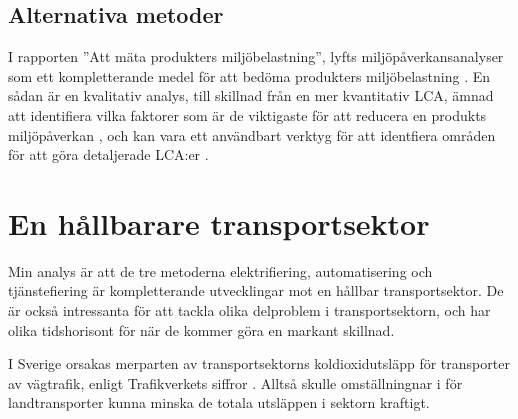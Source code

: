 \documentclass{article}
\begin{document}
\subsection{Alternativa metoder}

I rapporten ''Att mäta produkters miljöbelastning'', lyfts miljöpåverkansanalyser som ett kompletterande medel för att bedöma produkters miljöbelastning . En sådan är en kvalitativ analys, till skillnad från en mer kvantitativ LCA, ämnad att identifiera vilka faktorer som är de viktigaste för att reducera en produkts miljöpåverkan , och kan vara ett användbart verktyg för att identfiera områden för att göra detaljerade LCA:er .




\clearpage
\section{En hållbarare transportsektor}

Min analys är att de tre metoderna elektrifiering, automatisering och tjänstefiering är kompletterande utvecklingar mot en hållbar transportsektor. De är också intressanta för att tackla olika delproblem i transportsektorn, och har olika tidshorisont för när de kommer göra en markant skillnad. 

I Sverige orsakas merparten av transportsektorns koldioxidutsläpp för transporter av vägtrafik, enligt Trafikverkets siffror . Alltså skulle omställningnar i för landtransporter kunna minska de totala utsläppen i sektorn kraftigt.
\end{document}
